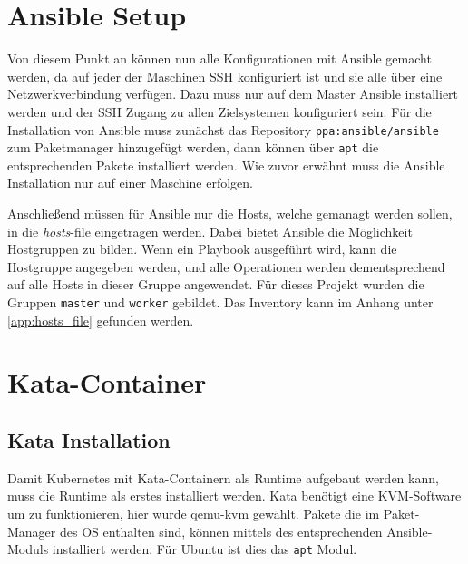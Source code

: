 \newpage

\section{Ansible Setup}
Von diesem Punkt an können nun alle Konfigurationen mit Ansible gemacht werden, da auf jeder der Maschinen \ac{SSH} konfiguriert ist und sie alle über eine Netzwerkverbindung verfügen.
Dazu muss nur auf dem Master Ansible installiert werden und der \ac{SSH} Zugang zu allen Zielsystemen konfiguriert sein. 
Für die Installation von Ansible muss zunächst das Repository \texttt{ppa:ansible/ansible} zum Paketmanager hinzugefügt werden, dann können über \texttt{apt} die entsprechenden Pakete installiert werden.
Wie zuvor erwähnt muss die Ansible Installation nur auf einer Maschine erfolgen.

Anschließend müssen für Ansible nur die Hosts, welche gemanagt werden sollen, in die \textit{hosts}-file eingetragen werden.
Dabei bietet Ansible die Möglichkeit Hostgruppen zu bilden. 
Wenn ein Playbook ausgeführt wird, kann die Hostgruppe angegeben werden, und alle Operationen werden dementsprechend auf alle Hosts in dieser Gruppe angewendet. 
Für dieses Projekt wurden die Gruppen \texttt{master} und \texttt{worker} gebildet.
Das Inventory kann im Anhang unter \ref{app:hosts_file} gefunden werden.

\section{Kata-Container}
\subsection{Kata Installation}

Damit Kubernetes mit Kata-Containern als Runtime aufgebaut werden kann, muss die Runtime als erstes installiert werden.
Kata benötigt eine \ac{KVM}-Software um zu funktionieren, hier wurde qemu-kvm gewählt.
Pakete die im Paket-Manager des \ac{OS} enthalten sind, können mittels des entsprechenden Ansible-Moduls installiert werden.
Für Ubuntu ist dies das \texttt{apt} Modul. 

